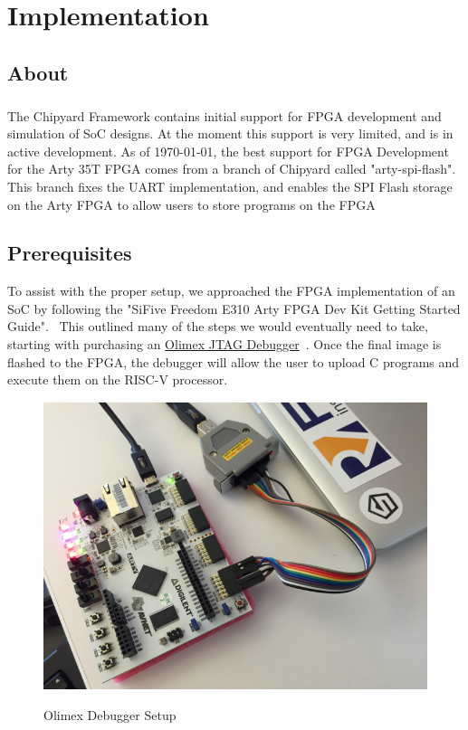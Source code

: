 \chapter{\texorpdfstring{}{FPGA} Implementation}\label{chap:FPGA_Implementation}

\section{About}\label{sec:About}
\paragraph{}The Chipyard Framework contains initial support for FPGA development and simulation of SoC designs. 
At the moment this support is very limited, and is in active development. 
As of \today, the best support for FPGA Development for the Arty 35T FPGA comes from a branch of Chipyard called "arty-spi-flash". 
This branch fixes the UART implementation, and enables the SPI Flash storage on the Arty FPGA to allow users to store programs on the FPGA


\section{Prerequisites}\label{sec:Prerequisites}
To assist with the proper setup, we approached the FPGA implementation of an SoC by following the "SiFive Freedom E310 Arty FPGA Dev Kit Getting Started Guide".~\cite{FreedomDevGuide}
This outlined many of the steps we would eventually need to take, starting with purchasing an \href{https://www.digikey.com/en/products/detail/olimex-ltd/ARM-USB-TINY-H/3471388}{Olimex JTAG Debugger}~\cite{OlimexJTAG}. 
Once the final image is flashed to the FPGA, the debugger will allow the user to upload C programs and execute them on the RISC-V processor. 

\begin{figure}[h]
	\centering
	\includegraphics[width=0.7\linewidth]{Images/OlimexSetup}
	\caption[]{Olimex Debugger Setup}
	\label{fig:olimexsetup}
	\cite[p.~5]{FreedomDevGuide}
\end{figure}



